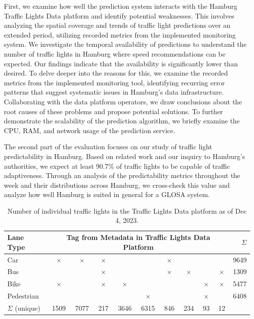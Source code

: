 First, we examine how well the prediction system interacts with the Hamburg Traffic Lights Data platform and identify potential weaknesses. This involves analyzing the spatial coverage and trends of traffic light predictions over an extended period, utilizing recorded metrics from the implemented monitoring system. We investigate the temporal availability of predictions to understand the number of traffic lights in Hamburg where speed recommendations can be expected. Our findings indicate that the availability is significantly lower than desired. To delve deeper into the reasons for this, we examine the recorded metrics from the implemented monitoring tool, identifying recurring error patterns that suggest systematic issues in Hamburg's data infrastructure. Collaborating with the data platform operators, we draw conclusions about the root causes of these problems and propose potential solutions. To further demonstrate the scalability of the prediction algorithm, we briefly examine the CPU, RAM, and network usage of the prediction service.

The second part of the evaluation focuses on our study of traffic light predictability in Hamburg. Based on related work and our inquiry to Hamburg's authorities, we expect at least 90.7\% of traffic lights to be capable of traffic adaptiveness. Through an analysis of the predictability metrics throughout the week and their distributions across Hamburg, we cross-check this value and analyze how well Hamburg is suited in general for a GLOSA system.

\begin{table}[t]
    \centering
    \begin{tabular}{@{}lcccccccccr@{}}
        \toprule
        \textbf{Lane Type} & \multicolumn{9}{c}{\textbf{Tag from Metadata in Traffic Lights Data Platform}} & \textbf{$\Sigma$} \\
        \midrule
        Car        & $\times$ & $\times$ & $\times$ &   &   & $\times$ &   &   &   &  9649 \\
        Bus        &   &   & $\times$ &   &   & $\times$ & $\times$ &   & $\times$ &  1309 \\
        Bike     & $\times$ &   & $\times$ & $\times$ &   &   &   & $\times$ & $\times$ &  5477 \\
        Pedestrian &   &   &   &   & $\times$ &   &   & $\times$ &   &  6408 \\
        \midrule
        $\Sigma$ (unique) & 1509 & 7077 & 217 & 3646 & 6315 & 846 & 234 & 93 & 12 & \\
        \bottomrule
    \end{tabular}
    \caption{Number of individual traffic lights in the Traffic Lights Data platform as of Dec 4, 2023.}
    \label{tab:tld-number-of-things}
\end{table}


